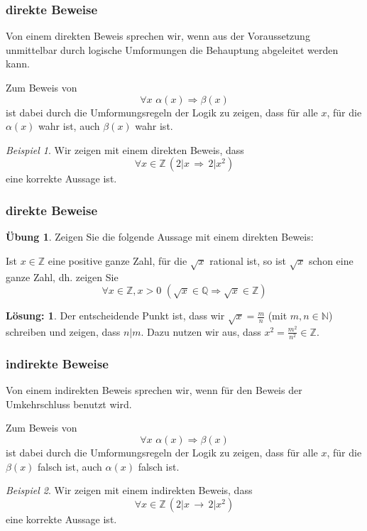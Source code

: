 \documentclass[hyperref={pdfpagelabels=false}]{beamer}
\theoremstyle{plain}%
\theoremstyle{definition}
\newtheorem*{uebung}{Übung}
\newtheorem*{sol}{Lösung:}
\theoremstyle{remark}
\newtheorem*{beispiel}{Beispiel}
\begin{document}
\begin{frame}
\frametitle{direkte Beweise}

Von einem direkten Beweis sprechen wir, wenn aus der Voraussetzung unmittelbar durch logische
Umformungen die Behauptung abgeleitet werden kann. 

\pause 

Zum Beweis von 
	$$ \forall x \,\, \alpha(x) \Longrightarrow \beta(x) $$
ist dabei durch die Umformungsregeln der Logik zu zeigen, dass für alle $x$, für die $\alpha(x)$ wahr ist, 
auch $\beta(x)$ wahr ist. 

\pause 

\begin{beispiel}
Wir zeigen mit einem direkten Beweis, dass 
  	$$ \forall x \in \mathbb Z \, \left( 2 \vert x\, \Longrightarrow \, 2 \vert x^2 \right) $$
eine korrekte Aussage ist. 
\end{beispiel}

\end{frame}

\begin{frame}
\frametitle{direkte Beweise}

\begin{uebung}
Zeigen Sie die folgende Aussage mit einem direkten Beweis: 

Ist $x \in \mathbb Z$ eine positive ganze Zahl, für die $\sqrt{x}$ rational ist, so ist $\sqrt{x}$ schon eine 
ganze Zahl, dh.  zeigen Sie 
	$$ \forall x \in \mathbb Z, x > 0 \,\, \left(\sqrt{x} \in \mathbb Q \Longrightarrow \sqrt{x} \in \mathbb Z 
	\right) $$ 
\end{uebung}

\pause \pause 

\begin{sol}
Der entscheidende Punkt ist, dass wir $\sqrt{x} = \frac {m}{n}$ (mit $m,n \in \mathbb N$) schreiben und 
zeigen, dass $n \vert m$. Dazu nutzen wir aus, dass $x^2 = \frac {m^2}{n^2} \in \mathbb Z$.  
\end{sol}
\end{frame}

\begin{frame}
\frametitle{indirekte Beweise}
Von einem indirekten Beweis sprechen wir, wenn für den Beweis der Umkehrschluss benutzt wird. 

\pause 

Zum Beweis von 
	$$ \forall x \,\, \alpha(x) \Longrightarrow \beta(x) $$
ist dabei durch die Umformungsregeln der Logik zu zeigen, dass für alle $x$, für die $\beta(x)$ falsch ist, 
auch $\alpha(x)$ falsch ist. 

\pause 

\begin{beispiel}
Wir zeigen mit einem indirekten Beweis, dass 
  	$$ \forall x \in \mathbb Z \, \left( 2 \vert x\, \longrightarrow \, 2 \vert x^2 \right) $$
eine korrekte Aussage ist. 
\end{beispiel}


\end{frame}
\end{document}
